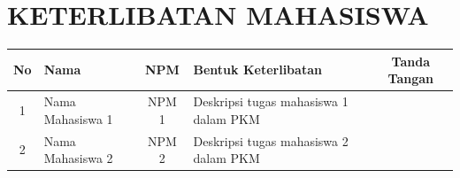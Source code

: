 \section*{KETERLIBATAN MAHASISWA}

\begin{table}[h]
    \centering
    \begin{tabularx}{\textwidth}{|c|X|c|X|c|}
        \hline
        \textbf{No} & \textbf{Nama} & \textbf{NPM} & \textbf{Bentuk Keterlibatan} & \textbf{Tanda Tangan} \\ \hline
        1 & Nama Mahasiswa 1 & NPM 1 & Deskripsi tugas mahasiswa 1 dalam PKM & \\ \hline
        2 & Nama Mahasiswa 2 & NPM 2 & Deskripsi tugas mahasiswa 2 dalam PKM & \\ \hline
    \end{tabularx}
\end{table}
